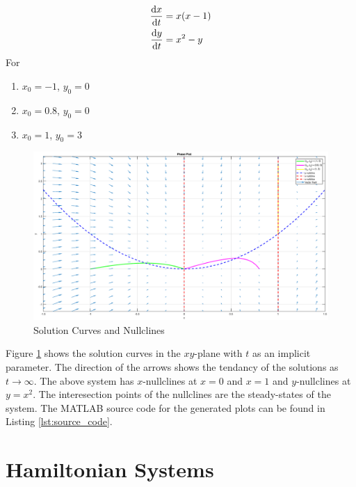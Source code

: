 \documentclass[11pt,1in]{article}
\newenvironment{Example}[2][Example]{\begin{trivlist}
		\item[\hskip \labelsep {\bfseries #1}\hskip \labelsep {\bfseries #2.}]}{\end{trivlist}}
\begin{document}
\begin{Example}{3}
	\cite[p.~487]{diff_eq}
	\begin{align*}
	\derivative{x}{t} &= x(x - 1)\\
	\derivative{y}{t} &= x^2 - y
	\end{align*}
	For 
	\begin{enumerate}
		\item $x_0 = -1$, $y_0 = 0$
		\item $x_0 = 0.8$, $y_0 = 0$
		\item $x_0 = 1$, $y_0 = 3$
	\end{enumerate}
\begin{figure}[H]
	\centering
	\includegraphics[trim={2in 0 2in 0},width=1\linewidth]{Figures/example_3_phase}
	\caption{Solution Curves and Nullclines}
	\label{fig:example3}
\end{figure}
Figure \ref{fig:example3} shows the solution curves in the $xy$-plane with $t$ as an implicit parameter. The direction of the arrows shows the tendancy of the solutions as $t\rightarrow\infty$. The above system has $x$-nullclines at $x = 0$ and $x = 1$ and $y$-nullclines at $y = x^2$. The interesection points of the nullclines are the steady-states of the system. The MATLAB source code for the generated plots can be found in Listing \ref{lst:source_code}.
 
\end{Example}
\section{Hamiltonian Systems}
\end{document}
